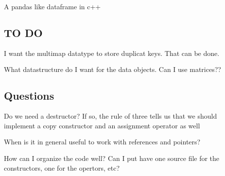 A pandas like dataframe in c++

\subsection*{TO DO }

I want the multimap datatype to store duplicat keys. That can be done.

What datastructure do I want for the data objects. Can I use matrices??

\subsection*{Questions }


\begin{DoxyItemize}
\item Do we need a destructor? If so, the rule of three tells us that we should implement a copy constructor and an assignment operator as well
\item When is it in general useful to work with references and pointers?
\item How can I organize the code well? Can I put have one source file for the constructors, one for the opertors, etc? 
\end{DoxyItemize}